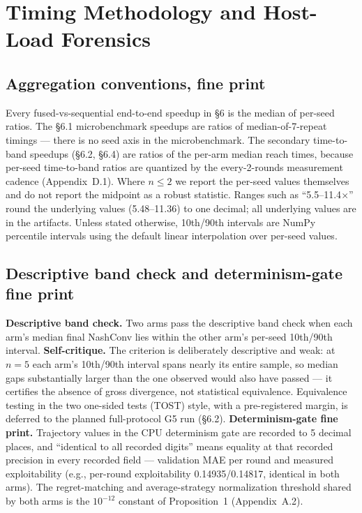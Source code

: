 \documentclass[11pt]{article}
\begin{document}
\section{Timing Methodology and Host-Load Forensics}

\subsection{Aggregation conventions, fine print}

Every fused-vs-sequential end-to-end speedup in \S6 is the median of per-seed ratios.
The \S6.1 microbenchmark speedups are ratios of median-of-7-repeat timings --- there is
no seed axis in the microbenchmark. The secondary time-to-band speedups (\S6.2, \S6.4)
are ratios of the per-arm median reach times, because per-seed time-to-band ratios are
quantized by the every-2-rounds measurement cadence (Appendix~D.1). Where $n \le 2$ we
report the per-seed values themselves and do not report the midpoint as a robust
statistic. Ranges such as ``5.5--11.4$\times$'' round the underlying values
(5.48--11.36) to one decimal; all underlying values are in the artifacts. Unless stated
otherwise, 10th/90th intervals are NumPy percentile intervals using the default linear
interpolation over per-seed values.

\subsection{Descriptive band check and determinism-gate fine print}

\textbf{Descriptive band check.} Two arms pass the descriptive band check when
each arm's median final NashConv lies within the other arm's per-seed 10th/90th
interval. \textbf{Self-critique.} The criterion is deliberately descriptive and weak: at
$n{=}5$ each arm's 10th/90th interval spans nearly its entire sample, so median gaps
substantially larger than the one observed would also have passed --- it certifies the
absence of gross divergence, not statistical equivalence. Equivalence testing in the two
one-sided tests (TOST) style, with a pre-registered margin, is deferred to the planned
full-protocol G5 run (\S6.2).
\textbf{Determinism-gate fine print.} Trajectory values in the CPU determinism gate are
recorded to 5 decimal places, and ``identical to all recorded digits'' means equality at
that recorded precision in every recorded field --- validation MAE per round and
measured exploitability (e.g., per-round exploitability 0.14935/0.14817, identical in
both arms). The regret-matching and average-strategy normalization threshold shared by
both arms is the $10^{-12}$ constant of Proposition~1 (Appendix~A.2).
\end{document}
